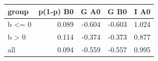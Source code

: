\begin{tabular}{lrrrr}
\toprule
group & p(1-p) B0 & G A0 & G B0 & I A0 \\
\midrule
b <= 0 & 0.089 & -0.604 & -0.603 & 1.024 \\
b > 0 & 0.114 & -0.374 & -0.373 & 0.877 \\
all & 0.094 & -0.559 & -0.557 & 0.995 \\
\bottomrule
\end{tabular}
